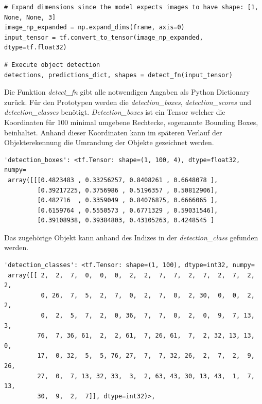 \vspace*{10mm}
\begin{lstlisting}[caption={Anpassung des Eingabetensors an das Modell}, label={lst:tensorfit}]
# Expand dimensions since the model expects images to have shape: [1, None, None, 3]
image_np_expanded = np.expand_dims(frame, axis=0)
input_tensor = tf.convert_to_tensor(image_np_expanded, dtype=tf.float32)
\end{lstlisting}

\begin{lstlisting}[caption={Ausführung der Objekterkennung}, label={lst:objectdetection_execution}]
# Execute object detection
detections, predictions_dict, shapes = detect_fn(input_tensor)
\end{lstlisting}

Die Funktion \emph{detect\_fn} gibt alle notwendigen Angaben als Python Dictionary zurück. Für den Prototypen werden die \emph{detection\_boxes}, \emph{detection\_scores} und \emph{detection\_classes} benötigt. \emph{Detection\_boxes} ist ein Tensor welcher die Koordinaten für 100 minimal umgebene Rechtecke, sogenannte Bounding Boxes, beinhaltet. Anhand dieser Koordinaten kann im späteren Verlauf der Objekterekennung die Umrandung der Objekte gezeichnet werden. 
 
\vspace*{10mm}
\begin{lstlisting}[caption={Beispielausschnitt der detection boxes}, label={lst:detectionbox_sample}]
'detection_boxes': <tf.Tensor: shape=(1, 100, 4), dtype=float32, numpy=
 array([[[0.4823483 , 0.33256257, 0.8408261 , 0.6648078 ],
         [0.39217225, 0.3756986 , 0.5196357 , 0.50812906],
         [0.482716  , 0.3359049 , 0.84076875, 0.6666065 ],
         [0.6159764 , 0.5550573 , 0.6771329 , 0.59031546],
         [0.39108938, 0.39384803, 0.43105263, 0.4248545 ]
\end{lstlisting}

Das zugehörige Objekt kann anhand des Indizes in der \emph{detection\_class} gefunden werden.

\vspace*{5mm}
\begin{lstlisting}[caption={Beispielausschnitt der detection classes}, label={lst:detectionclasses_sample}]
'detection_classes': <tf.Tensor: shape=(1, 100), dtype=int32, numpy=
 array([[ 2,  2,  7,  0,  0,  0,  2,  2,  7,  7,  2,  7,  2,  7,  2,  2,
          0, 26,  7,  5,  2,  7,  0,  2,  7,  0,  2, 30,  0,  0,  2,  2,
          0,  2,  5,  7,  2,  0, 36,  7,  7,  0,  2,  0,  9,  7, 13,  3,
         76,  7, 36, 61,  2,  2, 61,  7, 26, 61,  7,  2, 32, 13, 13,  0,
         17,  0, 32,  5,  5, 76, 27,  7,  7, 32, 26,  2,  7,  2,  9, 26,
         27,  0,  7, 13, 32, 33,  3,  2, 63, 43, 30, 13, 43,  1,  7, 13,
         30,  9,  2,  7]], dtype=int32)>,
\end{lstlisting}

